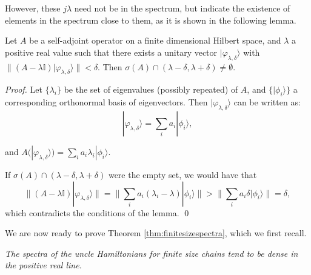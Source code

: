 \documentclass[cmp]{svjour}
\newcommand{\I}{\mathbb{I}}
\newcommand{\ket}[1]{|#1\rangle}
\begin{document}
However, these $j\lambda$ need not be in the spectrum, but indicate the existence of elements in the spectrum close to them, as it is shown in the following lemma.


\begin{lemma} \label{lemma:finiteappeigenvalues} Let $A$ be a self-adjoint operator on a finite dimensional Hilbert space, and $\lambda$ a positive real value such that there exists a unitary vector $\ket{\varphi_{\lambda,\delta}}$ with $\|(A-\lambda\I)\ket{\varphi_{\lambda,\delta}}\| <\delta$. Then $\sigma(A)\cap (\lambda-\delta,\lambda+\delta)\ne \emptyset$.
\end{lemma}

\begin{proof}
    Let $\{\lambda_i\}$ be the set of eigenvalues (possibly repeated) of $A$, and $\{\ket{\phi_i}\}$ a corresponding orthonormal basis of eigenvectors. Then
    $\ket{\varphi_{\lambda,\delta}}$ can be written as:
    \begin{equation}
        \ket{\varphi_{\lambda,\delta}}= \sum_i a_i \ket{\phi_i},
    \end{equation}

    \noindent and $A(\ket{\varphi_{\lambda,\delta}})=\sum_i a_i \lambda_i \ket{\phi_i}.$

    If  $\sigma(A)\cap (\lambda-\delta,\lambda+\delta)$ were the empty set, we would have that
    \begin{equation}
        \|(A-\lambda \I)\ket{\varphi_{\lambda,\delta}}\|=\|\sum_i a_i (\lambda_i-\lambda) \ket{\phi_i}\| > \|\sum_i a_i \delta \ket{\phi_i}\| =\delta ,
    \end{equation}
    which contradicts the conditions of the lemma.
    \hspace*{\fill}\qed
\end{proof}


We are now ready to prove Theorem \ref{thm:finitesizespectra}, which we first recall.

\bigskip

 {\it The spectra of the uncle Hamiltonians for finite size chains tend to be dense in the positive real line.}
\end{document}

